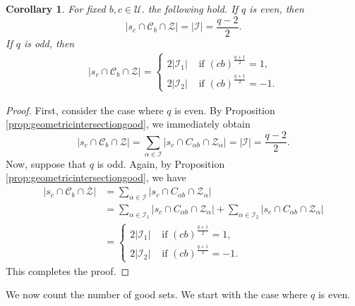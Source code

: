 \documentclass[11pt]{article}
\newtheorem{cor}[theorem]{Corollary}
\theoremstyle{definition}
\numberwithin{equation}{section}
\def\cC{\mathscr C}
\def\cI{\mathcal I}
\def\cU{\mathcal U}
\begin{document}
\begin{cor} \label{cor:totalintersection} For fixed $b,c \in \cU$. the following hold. If $q$ is even, then 
\[
 |s_c \cap \cC_{b} \cap \mathcal{Z}|=\lvert \cI \rvert=\frac{q-2}{2}.
\]
If $q$ is odd, then 
   \begin{align*}
      |s_c \cap \cC_{b} \cap \mathcal{Z}|= \begin{cases}
           2 \lvert \cI_1 \rvert & \mbox{ if } (cb)^{\frac{q+1}{2}}=1, \\
           2 \lvert \cI_2 \rvert & \mbox{ if } (cb)^{\frac{q+1}{2}}=-1.
       \end{cases}
    \end{align*}
\end{cor}

\begin{proof}
    First, consider the case where $q$ is even. By Proposition \ref{prop:geometricintersectiongood}, we immediately obtain
    \[
    |s_c \cap \cC_{b} \cap \mathcal{Z}|=\sum_{\alpha \in \cI} |s_c \cap C_{\alpha b} \cap \mathcal{Z}_{\alpha}|=\lvert \cI \rvert=\frac{q-2}{2}. 
    \]
    Now, suppose that $q$ is odd. Again, by Proposition \ref{prop:geometricintersectiongood}, we have
     \[
     \begin{array}{rl}
    |s_c \cap \cC_{b} \cap \mathcal{Z}| & =\sum\limits_{\alpha \in \cI} |s_c \cap C_{\alpha b} \cap \mathcal{Z}_{\alpha}|\\
    &
    =\sum\limits_{\alpha \in \cI_1} |s_c \cap C_{\alpha b} \cap \mathcal{Z}_{\alpha}| + \sum\limits_{\alpha \in \cI_2} |s_c \cap C_{\alpha b} \cap \mathcal{Z}_{\alpha}|\\
    & =\begin{cases}
           2 \lvert \cI_1 \rvert & \mbox{ if } (cb)^{\frac{q+1}{2}}=1, \\
           2 \lvert \cI_2 \rvert & \mbox{ if } (cb)^{\frac{q+1}{2}}=-1.
       \end{cases} 
     \end{array}
    \]
    This completes the proof.
\end{proof}

We now count the number of good sets. We start with the case where $q$ is even. 
\end{document}
